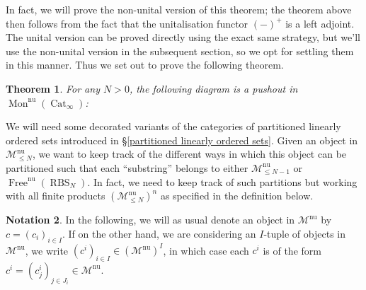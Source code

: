 \documentclass[12pt, reqno]{amsart}
\theoremstyle{plain}
\newtheorem{theorem}{Theorem}[section]
\theoremstyle{definition}
\newtheorem{notation}[theorem]{Notation}
\begin{document}
In fact, we will prove the non-unital version of this theorem; the theorem above then follows from the fact that the unitalisation functor $(-)^+$ is a left adjoint. The unital version can be proved directly using the exact same strategy, but we'll use the non-unital version in the subsequent section, so we opt for settling them in this manner. Thus we set out to prove the following theorem.

\begin{theorem}\label{non-unital E1-pushout diagram}
For any $N> 0$, the following diagram is a pushout in $\operatorname{Mon}^{\operatorname{nu}}(\operatorname{Cat}_\infty)$:
\begin{center}
\end{center}
\end{theorem}


We will need some decorated variants of the categories of partitioned linearly ordered sets introduced in \S \ref{partitioned linearly ordered sets}. Given an object in $\mathscr{M}^{\operatorname{nu}}_{\leq N}$, we want to keep track of the different ways in which this object can be partitioned such that each ``substring'' belongs to either $\mathscr{M}^{\operatorname{nu}}_{\leq N-1}$ or $\operatorname{Free}^{\operatorname{nu}}(\operatorname{RBS}_N)$. In fact, we need to keep track of such partitions but working with all finite products $(\mathscr{M}^{\operatorname{nu}}_{\leq N})^n$ as specified in the definition below.

\begin{notation}
In the following, we will as usual denote an object in $\mathscr{M}^{\operatorname{nu}}$ by $c=(c_i)_{i\in I}$. If on the other hand, we are considering an $I$-tuple of objects in $\mathscr{M}^{\operatorname{nu}}$, we write $(c^i)_{i\in I}\in (\mathscr{M}^{\operatorname{nu}})^I$, in which case each $c^i$ is of the form $c^i=(c^i_j)_{j\in J_i}\in \mathscr{M}^{\operatorname{nu}}$.
\end{notation}
\end{document}
